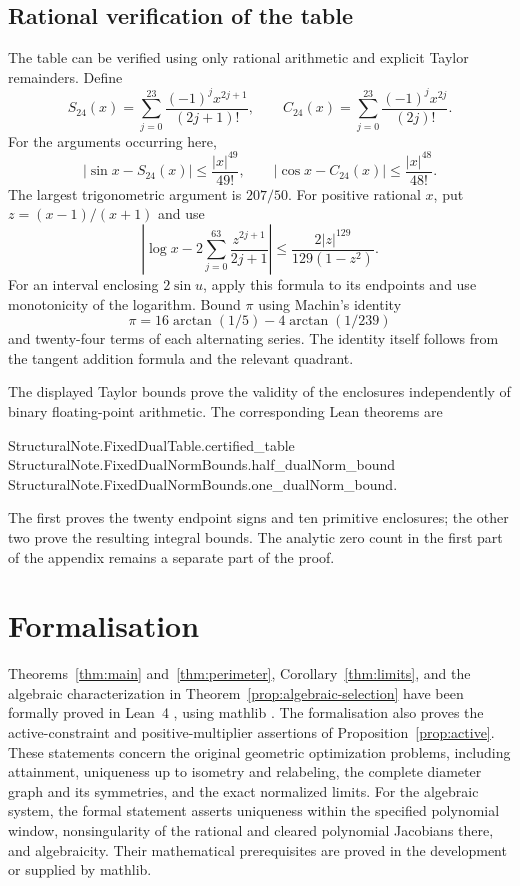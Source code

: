\documentclass[11pt,reqno]{amsart}
\numberwithin{equation}{section}
\theoremstyle{definition}
\theoremstyle{remark}
\begin{document}
\subsection{Rational verification of the table}
The table can be verified using only rational arithmetic and explicit Taylor remainders. Define
\[
 S_{24}(x)=\sum_{j=0}^{23}\frac{(-1)^jx^{2j+1}}{(2j+1)!},\qquad
 C_{24}(x)=\sum_{j=0}^{23}\frac{(-1)^jx^{2j}}{(2j)!}.
\]
For the arguments occurring here,
\[
 |\sin x-S_{24}(x)|\le\frac{|x|^{49}}{49!},\qquad
 |\cos x-C_{24}(x)|\le\frac{|x|^{48}}{48!}.
\]
The largest trigonometric argument is $207/50$. For positive rational $x$, put $z=(x-1)/(x+1)$ and use
\begin{equation}\label{eq:rational-log}
 \left|\log x-2\sum_{j=0}^{63}\frac{z^{2j+1}}{2j+1}\right|
 \le\frac{2|z|^{129}}{129(1-z^2)}.
\end{equation}
For an interval enclosing $2\sin u$, apply this formula to its endpoints and use monotonicity of the logarithm. Bound $\pi$ using Machin's identity
\[
 \pi=16\arctan(1/5)-4\arctan(1/239)
\]
and twenty-four terms of each alternating series. The identity itself follows from the tangent addition formula and the relevant quadrant.

The displayed Taylor bounds prove the validity of the enclosures independently of binary floating-point arithmetic. The corresponding Lean theorems are
\begin{center}
\small\ttfamily
StructuralNote.FixedDualTable.certified\_table\\
StructuralNote.FixedDualNormBounds.half\_dualNorm\_bound\\
StructuralNote.FixedDualNormBounds.one\_dualNorm\_bound.
\end{center}
The first proves the twenty endpoint signs and ten primitive enclosures; the other two prove the resulting integral bounds. The analytic zero count in the first part of the appendix remains a separate part of the proof.



\clearpage
\section{Formalisation}\label{app:formalisation}
Theorems~\ref{thm:main} and~\ref{thm:perimeter}, Corollary~\ref{thm:limits}, and the algebraic characterization in Theorem~\ref{prop:algebraic-selection} have been formally proved in Lean~4 \cite{lean4}, using mathlib \cite{mathlib}. The formalisation also proves the active-constraint and positive-multiplier assertions of Proposition~\ref{prop:active}. These statements concern the original geometric optimization problems, including attainment, uniqueness up to isometry and relabeling, the complete diameter graph and its symmetries, and the exact normalized limits. For the algebraic system, the formal statement asserts uniqueness within the specified polynomial window, nonsingularity of the rational and cleared polynomial Jacobians there, and algebraicity. Their mathematical prerequisites are proved in the development or supplied by mathlib.
\end{document}
